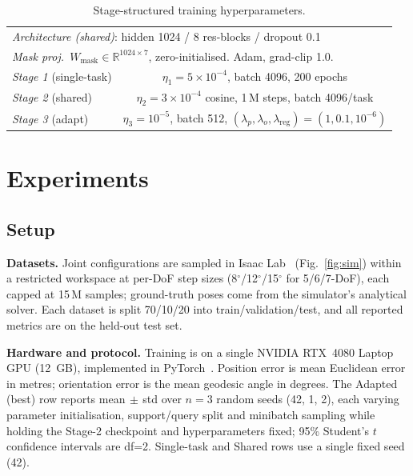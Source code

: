 \documentclass[conference]{IEEEtran}
\begin{document}
\begin{table}[!t]
\renewcommand{\arraystretch}{1.05}
\caption{Stage-structured training hyperparameters.}
\label{tab:hparams}
\centering
\footnotesize
\begin{tabular}{lc}
\toprule
\multicolumn{2}{l}{\textit{Architecture (shared)}: hidden 1024 / 8 res-blocks / dropout 0.1} \\
\multicolumn{2}{l}{\textit{Mask proj.\ }$W_{\mathrm{mask}}\!\in\!\mathbb{R}^{1024\times 7}$, zero-initialised. Adam, grad-clip 1.0.} \\
\midrule
\textit{Stage 1} (single-task) & $\eta_1\!=\!5\!\times\!10^{-4}$, batch 4096, 200 epochs \\
\textit{Stage 2} (shared) & $\eta_2\!=\!3\!\times\!10^{-4}$ cosine, 1\,M steps, batch 4096/task \\
\textit{Stage 3} (adapt) & $\eta_3\!=\!10^{-5}$, batch 512, $(\lambda_p,\lambda_o,\lambda_{\mathrm{reg}})\!=\!(1,0.1,10^{-6})$ \\
\bottomrule
\end{tabular}
\end{table}

\section{Experiments}\label{sec:exp}

\subsection{Setup}

\textbf{Datasets.} Joint configurations are sampled in Isaac Lab~\cite{mittal2023orbit} (Fig.~\ref{fig:sim}) within a restricted workspace at per-DoF step sizes (8$^\circ$/12$^\circ$/15$^\circ$ for 5/6/7-DoF), each capped at 15\,M samples; ground-truth poses come from the simulator's analytical solver. Each dataset is split 70/10/20 into train/validation/test, and all reported metrics are on the held-out test set.

\textbf{Hardware and protocol.} Training is on a single NVIDIA RTX~4080 Laptop GPU (12~GB), implemented in PyTorch~\cite{paszke2019pytorch}. Position error is mean Euclidean error in metres; orientation error is the mean geodesic angle in degrees. The Adapted (best) row reports mean$\,\pm\,$std over $n\!=\!3$ random seeds (42, 1, 2), each varying parameter initialisation, support/query split and minibatch sampling while holding the Stage-2 checkpoint and hyperparameters fixed; 95\% Student's $t$ confidence intervals are df=2. Single-task and Shared rows use a single fixed seed (42).
\end{document}
